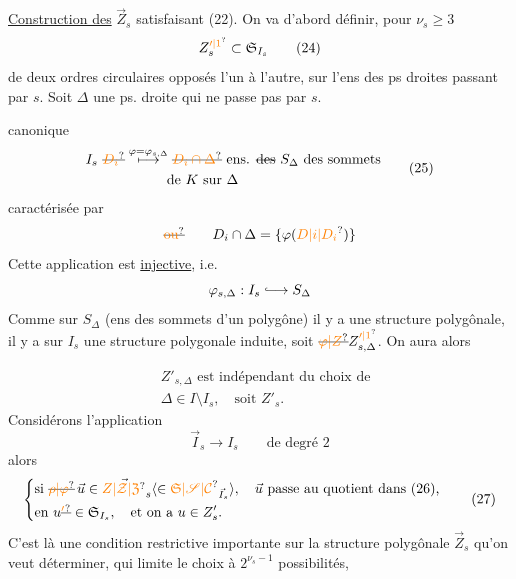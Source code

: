 \uline{Construction des} $\vec Z_s$ satisfaisant (22). On
va d'abord définir, pour $\nu_s\geq3$
\[Z_s^{\unsure{\prime|1}}\subset\mathfrak S_{I_s}\tag*{(24)}\]
 de deux ordres circulaires opposés
l'un à l'autre, sur l'ens  des ps droites passant
par $s$. Soit $\Delta$  une ps. droite qui ne
passe pas par $s$.  

canonique
\[\begin{aligned}
I_s\ \deleted{\unsure{D_i}}&\mathrel{\mathop{\longmapsto}\limits^{\varphi=\varphi_{s,\Delta}}}\deleted{\unsure{D_i\cap\Delta}}\ \text{ens. }\deleted{\text{des}}\ S_\Delta\text{ des sommets}\\
&\hspace{3em}\text{de }K\text{ sur }\Delta
\end{aligned}\tag*{(25)}\]
caractérisée par
\[\deleted{\unsure{\text{ou}}}\qquad D_i\cap\Delta=\{\varphi(\unsure{D|i|D_i})\}\]
Cette application est \uline{injective},  i.e.
\[\varphi_{s,\Delta}:I_s\lhook\joinrel\longrightarrow S_\Delta\]
Comme sur $S_\Delta$ (ens des sommets d'un polygône)
il y a une structure polygônale, il y a sur
$I_s$ une structure polygonale induite, 
soit $\deleted{\unsure{\varphi|Z}}Z_{s,\Delta}^{\unsure{\prime|1}}$. On aura alors

\[\begin{aligned} &Z'_{s,\Delta}\text{ est indépendant du choix de}\\
&\Delta\in I\setminus I_s,\quad\text{soit } Z'_s.
\end{aligned}\tag*{(A1)}\]
 Considérons l'application
\[\vec I_s\longrightarrow I_s\qquad\text{de degré }2\tag*{(26)}\]
 alors
\[\left\{\begin{aligned}
&\text{si }\deleted{\unsure{\rho|\varphi}}\,\vec u\in\vec{\unsure{Z|\mathcal Z|\mathfrak Z}}_s\inserted{\in{\unsure{\mathfrak S|\mathscr S|\mathcal C}}_{\vec I_s}},\quad\vec u\text{ passe au quotient dans (26),}\\
&\text{en }u\deleted{\unsure{'} }\in\mathfrak S_{I_s},\quad\text{et on a }u\in Z'_s.
\end{aligned}\right.\tag*{(27)}\]
C'est là une condition restrictive importante
sur la structure polygônale $\vec Z_s$ qu'on veut déterminer,
qui limite le choix à $2^{\nu_s-1}$ possibilités,

